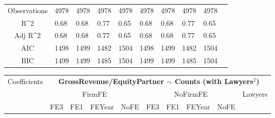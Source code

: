 \documentclass{article}
\begin{document}
\begin{table}[H]
\begin{tabular}{|clllllllll|}
   &  &  &  &  &  &  &  &  & \\ 
  \hline 
 Observations & 4978 & 4978 & 4978 & 4978 & 4978 & 4978 & 4978 & 4978 & \\ 
  R^2 & 0.68 & 0.68 & 0.77 & 0.65 & 0.68 & 0.68 & 0.77 & 0.65 & \\ 
  Adj R^2 & 0.68 & 0.68 & 0.77 & 0.65 & 0.68 & 0.68 & 0.77 & 0.65 & \\ 
  AIC & 1498 & 1499 & 1482 & 1504 & 1498 & 1499 & 1482 & 1504 & \\ 
  BIC & 1499 & 1499 & 1485 & 1504 & 1499 & 1499 & 1485 & 1504 & \\ 
   \hline
\end{tabular}
 
\end{table}


\begin{table}[H]
\centering
\begin{tabular}{|clllllllll|}
\hline
\multirow{3}{*}{Coefficients} & \multicolumn{9}{c|}{\textbf{GrossRevenue/EquityPartner $\sim$ Counts (with Lawyers$^2$)}} \\
\cline{2-10}
& \multicolumn{4}{c}{FirmFE} & \multicolumn{4}{c}{NoFirmFE} & \multirow{2}{*}{Lawyers} \\
\cline{2-9}
& FE3 & FE1 & FEYear & NoFE & FE3 & FE1 & FEYear & NoFE &  \\
\hline
 

\end{tabular}
\end{table}
\end{document}
